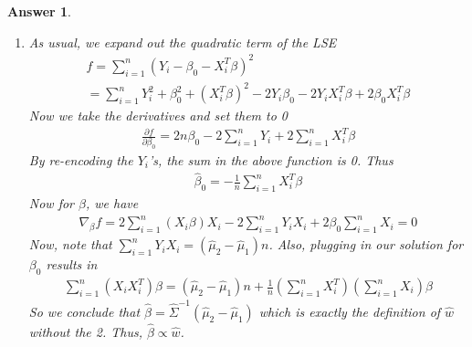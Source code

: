 \documentclass[12pt]{article}
\theoremstyle{colon}
\newtheorem*{answer}{Answer}
\begin{document}
\begin{answer}
\begin{enumerate}[label=\arabic*)]
    \item As usual, we expand out the quadratic term of the LSE
      \begin{gather*}
        f = \sum_{i=1}^n (Y_i - \beta_0 - X_i^T \beta)^2 \\
        = \sum_{i=1}^n Y_i^2 + \beta_0^2 + (X_i^T \beta)^2 - 2 Y_i \beta_0 - 2Y_i X_i^T \beta + 2 \beta_0 X_i^T \beta
      \end{gather*}
      Now we take the derivatives and set them to 0
      \begin{align*}
        \frac{\partial f}{\partial \beta_0} = 2 n \beta_0 - 2 \sum_{i=1}^n Y_i + 2 \sum_{i=1}^n X_i^T \beta
      \end{align*}
      By re-encoding the $Y_i$'s, the sum in the above function is 0. Thus
      \begin{gather*}
        \hat{\beta}_0 = -\frac{1}{n} \sum_{i=1}^n X_i^T \beta
      \end{gather*}
      Now for $\beta$, we have
      \begin{gather*}
        \nabla_\beta f = 2 \sum_{i=1}^n (X_i \beta) X_i - 2 \sum_{i=1}^n Y_i X_i + 2 \beta_0 \sum_{i=1}^n X_i = 0
      \end{gather*}
      Now, note that $\sum_{i=1}^n Y_i X_i = (\hat{\mu}_2 - \hat{\mu}_1)n$. Also, plugging in our solution for $\beta_0$ results in
      \begin{gather*}
        \sum_{i=1}^n (X_i X_i^T) \beta = (\hat{\mu}_2 - \hat{\mu}_1)n + \frac{1}{n} \left( \sum_{i=1}^n X_i^T \right) \left( \sum_{i=1}^n X_i \right) \beta
      \end{gather*}
      So we conclude that $\hat{\beta} = \hat{\Sigma}^{-1} (\hat{\mu}_2 - \hat{\mu}_1)$ which is exactly the definition of $\hat{w}$ without the 2. Thus, $\hat{\beta} \propto \hat{w}$.


\end{enumerate}
\end{answer}
\end{document}
